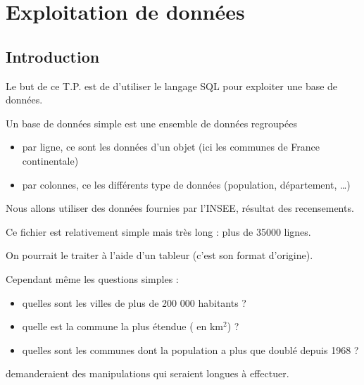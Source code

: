 \chapter{Exploitation de données}
\thispagestyle{empty}
\section{Introduction}
Le but de ce T.P. est de d'utiliser le langage SQL pour exploiter une base de données.

Un base de données simple est une ensemble de données regroupées 
\begin{itemize}
\item par ligne, ce sont les données d'un objet (ici les communes de France continentale)
\item par colonnes, ce les différents type de données (population, département, \dots)
\end{itemize}

Nous allons utiliser des données fournies par l'INSEE, résultat des recensements.

Ce fichier est relativement simple mais très long : plus de 35000 lignes.

On pourrait le traiter à l'aide d'un tableur (c'est son format d'origine).

Cependant même les questions simples :
\begin{itemize}
\item quelles sont les villes de plus de 200 000 habitants ?
\item quelle est la commune la plus étendue ( en km$^2$) ?
\item quelles sont les communes dont la population a plus que doublé depuis 1968 ?
\end{itemize}
demanderaient des manipulations qui seraient longues à effectuer.

